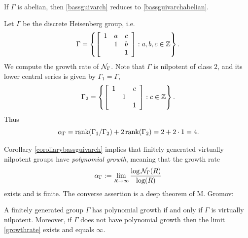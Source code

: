 \begin{example}
If $\Gamma$ is abelian, then \eqref{bassguivarch} reduces to \eqref{bassguivarchabelian}.
\end{example}

\begin{example}
\label{exampleheisenberg}
Let $\Gamma$ be the discrete Heisenberg group, i.e.
\[
\Gamma = \left\{\left[\begin{array}{ccc}
1 & a & c\\
& 1 & b\\
&& 1
\end{array}\right] : a,b,c\in\Z\right\}.
\]
We compute the growth rate of $\mathcal N_\Gamma$. Note that $\Gamma$ is nilpotent of class $2$, and its lower central series is given by $\Gamma_1 = \Gamma$,
\[
\Gamma_2 = \left\{\left[\begin{array}{ccc}
1 & & c\\
& 1 &\\
&& 1
\end{array}\right] : c\in\Z\right\}.
\]
Thus
\[
\alpha_\Gamma = \operatorname{rank}(\Gamma_1/\Gamma_2) + 2\operatorname{rank}(\Gamma_2) = 2 + 2\cdot 1 = 4.
\]
\end{example}


Corollary \ref{corollarybassguivarch} implies that finitely generated virtually nilpotent groups have \emph{polynomial growth}, meaning that the growth rate
\begin{equation}
\label{growthrate}
\alpha_\Gamma := \lim_{R\to\infty}\frac{\log \mathcal N_\Gamma(R)}{\log(R)}
\end{equation}
exists and is finite. The converse assertion is a deep theorem of M. Gromov:

\begin{theorem}
\label{theoremgromov}
A finitely generated group $\Gamma$ has polynomial growth if and only if $\Gamma$ is virtually nilpotent. Moreover, if $\Gamma$ does not have polynomial growth then the limit \eqref{growthrate} exists and equals $\infty$.
\end{theorem}

